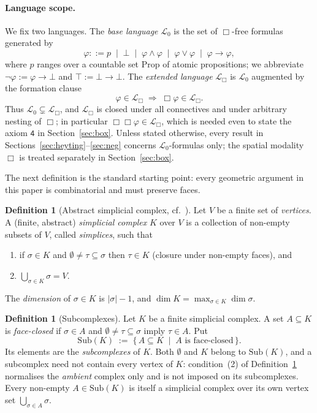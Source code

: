 \documentclass[final,12pt]{elsarticle}
\theoremstyle{plain}
\theoremstyle{definition}
\newtheorem{defi}[thm]{Definition}
\begin{document}
\paragraph{Language scope.}\label{def:languages}
We fix two languages. The \emph{base language} \(\mathcal{L}_0\) is the set of
\(\Box\)-free formulas generated by
\[
  \varphi ::= p \;\mid\; \bot \;\mid\; \varphi \wedge \varphi
        \;\mid\; \varphi \vee \varphi \;\mid\; \varphi \to \varphi,
\]
where \(p\) ranges over a countable set \(\mathrm{Prop}\) of atomic
propositions; we abbreviate \(\neg\varphi := \varphi\to\bot\) and
\(\top := \bot\to\bot\). The \emph{extended language} \(\mathcal{L}_\Box\) is
\(\mathcal{L}_0\) augmented by the formation clause
\[
  \varphi \in \mathcal{L}_\Box \;\Longrightarrow\; \Box\varphi \in \mathcal{L}_\Box .
\]
Thus \(\mathcal{L}_0 \subsetneq \mathcal{L}_\Box\), and \(\mathcal{L}_\Box\) is
closed under all connectives and under arbitrary nesting of \(\Box\); in
particular \(\Box\Box\varphi \in \mathcal{L}_\Box\), which is needed even to
state the axiom \(\mathsf{4}\) in Section~\ref{sec:box}. Unless stated
otherwise, every result in Sections~\ref{sec:heyting}--\ref{sec:neg} concerns
\(\mathcal{L}_0\)-formulas only; the spatial modality \(\Box\) is treated
separately in Section~\ref{sec:box}.

\medskip
The next definition is the standard starting point: every geometric argument in
this paper is combinatorial and must preserve faces.

\begin{defi}[Abstract simplicial complex, cf.\ \cite{hatcher2002}]
\label{def:simplicial-complex}
Let \(V\) be a finite set of \emph{vertices}. A (finite, abstract)
\emph{simplicial complex} \(K\) over \(V\) is a collection of non-empty subsets
of \(V\), called \emph{simplices}, such that
\begin{enumerate}
    \item if \(\sigma \in K\) and \(\emptyset \neq \tau \subseteq \sigma\) then
          \(\tau \in K\) (closure under non-empty faces), and
    \item \(\bigcup_{\sigma \in K} \sigma = V\).
\end{enumerate}
The \emph{dimension} of \(\sigma \in K\) is \(\lvert\sigma\rvert - 1\), and
\(\dim K = \max_{\sigma \in K} \dim \sigma\).
\end{defi}

\begin{defi}[Subcomplexes]
\label{def:subcomplex}
Let \(K\) be a finite simplicial complex. A set \(A \subseteq K\) is
\emph{face-closed} if \(\sigma \in A\) and \(\emptyset \neq \tau \subseteq \sigma\)
imply \(\tau \in A\). Put
\[
  \mathrm{Sub}(K) \;:=\; \{\, A \subseteq K \;\mid\; A \text{ is face-closed} \,\} .
\]
Its elements are the \emph{subcomplexes} of \(K\). Both \(\emptyset\) and \(K\)
belong to \(\mathrm{Sub}(K)\), and a subcomplex need not contain every vertex of
\(K\): condition~(2) of Definition~\ref{def:simplicial-complex} normalises the
\emph{ambient} complex only and is not imposed on its subcomplexes. Every
non-empty \(A \in \mathrm{Sub}(K)\) is itself a simplicial complex over its own
vertex set \(\bigcup_{\sigma \in A}\sigma\).
\end{defi}
\end{document}
